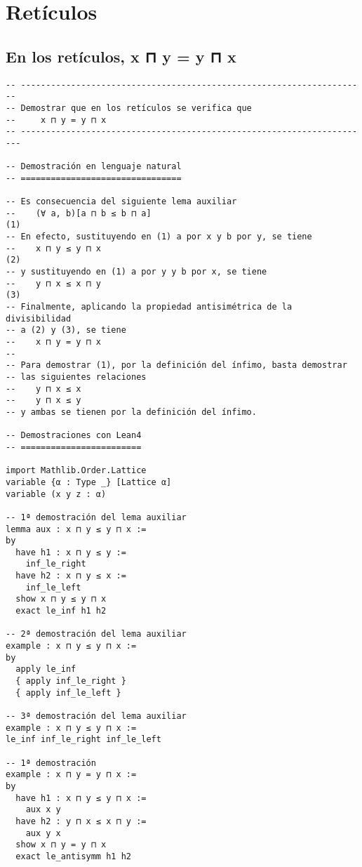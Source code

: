 \chapter{Retículos}
\label{sec:org65a2ae9}

\section{En los retículos, x ⊓ y = y ⊓ x}
\label{sec:org908141f}
\begin{verbatim}
-- ---------------------------------------------------------------------
-- Demostrar que en los retículos se verifica que
--     x ⊓ y = y ⊓ x
-- ----------------------------------------------------------------------

-- Demostración en lenguaje natural
-- ================================

-- Es consecuencia del siguiente lema auxiliar
--    (∀ a, b)[a ⊓ b ≤ b ⊓ a]                                         (1)
-- En efecto, sustituyendo en (1) a por x y b por y, se tiene
--    x ⊓ y ≤ y ⊓ x                                                   (2)
-- y sustituyendo en (1) a por y y b por x, se tiene
--    y ⊓ x ≤ x ⊓ y                                                   (3)
-- Finalmente, aplicando la propiedad antisimétrica de la divisibilidad
-- a (2) y (3), se tiene
--    x ⊓ y = y ⊓ x
--
-- Para demostrar (1), por la definición del ínfimo, basta demostrar
-- las siguientes relaciones
--    y ⊓ x ≤ x
--    y ⊓ x ≤ y
-- y ambas se tienen por la definición del ínfimo.

-- Demostraciones con Lean4
-- ========================

import Mathlib.Order.Lattice
variable {α : Type _} [Lattice α]
variable (x y z : α)

-- 1ª demostración del lema auxiliar
lemma aux : x ⊓ y ≤ y ⊓ x :=
by
  have h1 : x ⊓ y ≤ y :=
    inf_le_right
  have h2 : x ⊓ y ≤ x :=
    inf_le_left
  show x ⊓ y ≤ y ⊓ x
  exact le_inf h1 h2

-- 2ª demostración del lema auxiliar
example : x ⊓ y ≤ y ⊓ x :=
by
  apply le_inf
  { apply inf_le_right }
  { apply inf_le_left }

-- 3ª demostración del lema auxiliar
example : x ⊓ y ≤ y ⊓ x :=
le_inf inf_le_right inf_le_left

-- 1ª demostración
example : x ⊓ y = y ⊓ x :=
by
  have h1 : x ⊓ y ≤ y ⊓ x :=
    aux x y
  have h2 : y ⊓ x ≤ x ⊓ y :=
    aux y x
  show x ⊓ y = y ⊓ x
  exact le_antisymm h1 h2


\end{verbatim}
